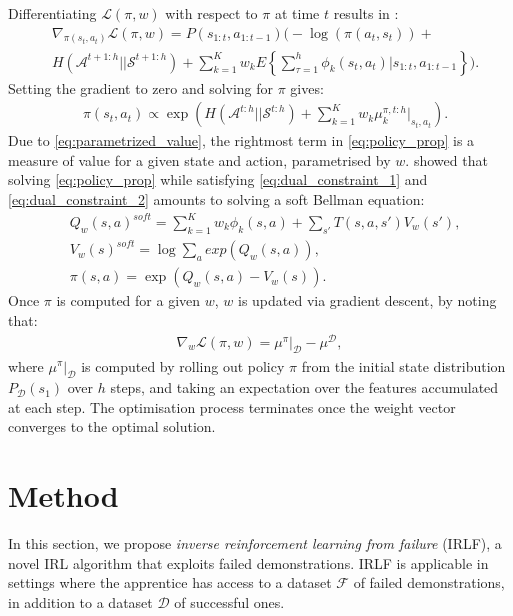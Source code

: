 \documentclass{aamas2016}
\begin{document}
Differentiating $\mathcal{L}(\pi,w)$ with respect to $\pi$ at time $t$ results in \cite[p.\ 186]{ziebart2010modelingthesis}:
\begin{equation}
 \begin{split}
 &\nabla_{\pi(s_t,a_t)}\mathcal{L}(\pi,w) = P(s_{1:t},a_{1:t-1})\Bigg(-\log(\pi(a_t,s_t))+ \\
& H(\mathcal{A}^{t+1:h}||\mathcal{S}^{t+1:h})
 +\sum_{k=1}^K w_kE\left\{\sum_{\tau=1}^h \phi_k(s_t,a_t)|s_{1:t},a_{1:t-1}\right\}\Bigg). \label{eqn:zieb_lagragian_derivative}
 \end{split}
\end{equation}
Setting the gradient to zero and solving for $\pi$ gives:
\begin{equation}
\label{eq:policy_prop}
	\begin{split}
	&\pi(s_t,a_t) \propto \exp\left(H(\mathcal{A}^{t:h}||\mathcal{S}^{t:h})+\sum^K_{k=1} w_k\mu_k^{\pi,t:h}|_{s_t,a_t}\right).
	\end{split}
\end{equation}
Due to \eqref{eq:parametrized_value}, the rightmost term in \eqref{eq:policy_prop} is a measure of value for a given state and action, parametrised by $w$. \cite{ziebart2010modelingthesis} showed that solving \eqref{eq:policy_prop} while satisfying \eqref{eq:dual_constraint_1} and \eqref{eq:dual_constraint_2} amounts to solving a soft Bellman equation:
	\begin{equation}
		\begin{split}
	&Q_w(s,a)^{soft} = \sum_{k=1}^Kw_k\phi_k(s,a) + \sum_{s'}T(s,a,s')V_w(s'),\\	
	&V_w(s)^{soft} = \log\sum_{a}exp(Q_w(s,a)),\\
	&\pi(s,a) = \exp(Q_w(s,a) - V_w(s)).
	\end{split}
	\label{eq:soft_backup}
	\end{equation}
Once $\pi$ is computed for a given $w$, $w$ is updated via gradient descent, by noting that:
 \begin{align}
   \label{eq:weight_update}
   \nabla_{w}\mathcal{L}(\pi,w) =\mu^\pi|_{\mathcal{D}} - \mu^{\mathcal{D}},
 \end{align}
where $\mu^\pi|_{\mathcal{D}}$ is computed by rolling out policy $\pi$ from the initial state distribution $P_{\mathcal{D}}(s_1)$ over $h$ steps, and taking an expectation over the features accumulated at each step. The optimisation process terminates once the weight vector converges to the optimal solution.

\section{Method}
In this section, we propose \emph{inverse reinforcement learning from failure} (IRLF), a novel IRL algorithm that exploits failed demonstrations.  IRLF is applicable in settings where the apprentice has access to a dataset $\mathcal{F}$ of failed demonstrations, in addition to a dataset $\mathcal{D}$ of successful ones.
\end{document}
